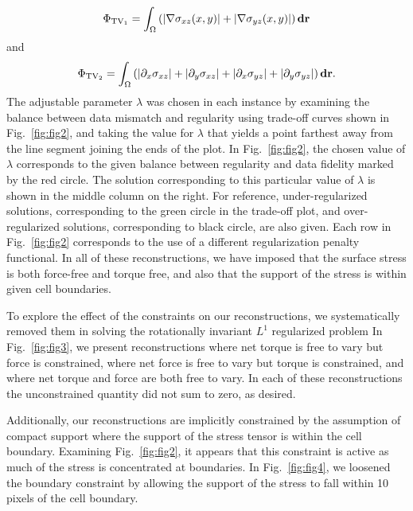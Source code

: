 \documentclass[aps,prl,reprint,twocolumn,groupedaddress,showpacs]{revtex4-1}
\def\d{{\bf d}}
\def\r{{\bf r}}
\begin{document}
\begin{equation}
 \Phi_{{\rm TV}_1} = \int_\Omega \left( \vert\nabla\sigma_{xz}(x,y) \vert +
 \vert\nabla\sigma_{yz}(x,y) \vert\right)\d\r
 \label{eq:PhiTV1}
\end{equation}
and
\begin{equation}
\Phi_{{\rm TV}_2} = \int_\Omega  \left( \vert\partial_x\sigma_{xz}\vert + \vert\partial_y\sigma_{xz}\vert + \vert\partial_x\sigma_{yz}\vert+ \vert\partial_y\sigma_{yz}\vert\right)\d\r.
 \label{eq:PhiTV2}
\end{equation}
%
The adjustable parameter $\lambda$ was chosen in each instance by
examining the balance between data mismatch and regularity using
trade-off curves shown in Fig.~\ref{fig:fig2}, and taking the value
for $\lambda$ that yields a point farthest away from the line segment
joining the ends of the plot. In Fig.~\ref{fig:fig2}, the chosen value
of $\lambda$ corresponds to the given balance between regularity and
data fidelity marked by the red circle. The solution corresponding to
this particular value of $\lambda$ is shown in the middle column on
the right. For reference, under-regularized solutions, corresponding
to the green circle in the trade-off plot, and over-regularized
solutions, corresponding to black circle, are also given. Each row in
Fig.~\ref{fig:fig2} corresponds to the use of a different
regularization penalty functional. In all of these reconstructions, we
have imposed that the surface stress is both force-free and torque
free, and also that the support of the stress is within given cell
boundaries.

To explore the effect of the constraints on our reconstructions, we
systematically removed them in solving the rotationally invariant
$L^1$ regularized problem In Fig.~\ref{fig:fig3}, we present
reconstructions where net torque is free to vary but force is
constrained, where net force is free to vary but torque is
constrained, and where net torque and force are both free to vary. In
each of these reconstructions the unconstrained quantity did not sum
to zero, as desired.

Additionally, our reconstructions are implicitly constrained by the
assumption of compact support where the support of the stress tensor
is within the cell boundary. Examining Fig.~\ref{fig:fig2}, it appears
that this constraint is active as much of the stress is concentrated
at boundaries. In Fig.~\ref{fig:fig4}, we loosened the boundary
constraint by allowing the support of the stress to fall within 10
pixels of the cell boundary.
\end{document}
